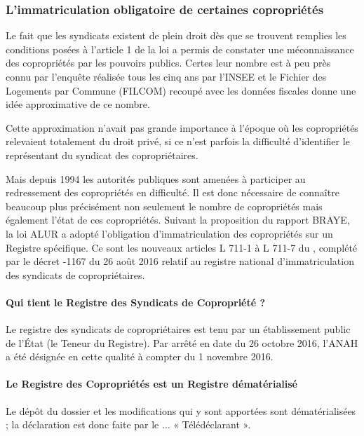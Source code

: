 		\subsubsection{L’immatriculation obligatoire de certaines copropriétés}
		
			Le fait que les syndicats existent de plein droit dès que se trouvent remplies les conditions posées à l’article 1\ier{} de la loi a permis de constater une méconnaissance des copropriétés par les pouvoirs publics. Certes leur nombre est à peu près connu par l’enquête réalisée tous les cinq ans par l’INSEE et le Fichier des Logements par Commune (FILCOM) recoupé avec les données fiscales donne une idée approximative de ce nombre.
			
			Cette approximation n’avait pas grande importance à l’époque où les copropriétés relevaient totalement du droit privé, si ce n’est parfois la difficulté d’identifier le représentant du syndicat des copropriétaires.
			
			Mais depuis 1994 les autorités publiques sont amenées à participer au redressement des copropriétés en difficulté. Il est donc nécessaire de connaître beaucoup plus précisément non seulement le nombre de copropriétés mais également l’état de ces copropriétés. Suivant la proposition du rapport BRAYE, la loi ALUR a adopté l’obligation d’immatriculation des copropriétés sur un Registre spécifique. Ce sont les nouveaux articles L 711-1 à L 711-7 du \CCH, complété par le décret -1167 du 26 août 2016 relatif au registre national d'immatriculation des syndicats de copropriétaires.
			
			\paragraph{Qui tient le Registre des Syndicats de Copropriété ?}
			
				Le registre des syndicats de copropriétaires est tenu par un établissement public de l'État (le Teneur du Registre). Par arrêté en date du 26 octobre 2016, l’ANAH a été désignée en cette qualité à compter du 1\ier{} novembre 2016.
			
			\paragraph{Le Registre des Copropriétés est un Registre dématérialisé}
			
				Le dépôt du dossier et les modifications qui y sont apportées sont dématérialisées ; la déclaration est donc faite par le $\dots$ « Télédéclarant ».
				
